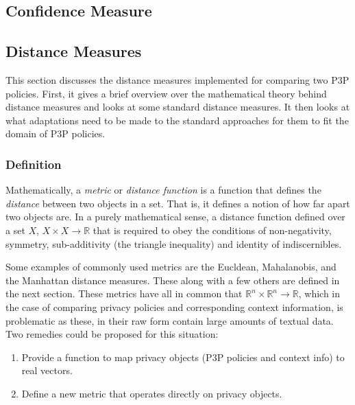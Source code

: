 \subsection{Confidence Measure}\label{confidenceMeasure}%

\subsection{Distance Measures}\label{SimilarityMeasures}%

This section discusses the distance measures implemented for comparing two P3P policies. First, it gives a brief overview over the mathematical theory behind distance measures and looks at some standard distance measures. It then looks at what adaptations need to be made to the standard approaches for them to fit the domain of P3P policies.

\subsubsection{Definition}

Mathematically, a \emph{metric} or \emph{distance function} is a function that defines the \emph{distance} between two objects in a set. That is, it defines a notion of how far apart two objects are. In a purely mathematical sense, a distance function defined over a set $X$, $X\times X\longrightarrow \mathbb{R}$ that is required to obey the conditions of non-negativity, symmetry, sub-additivity (the triangle inequality) and identity of indiscernibles. 

Some examples of commonly used metrics are the Eucldean, Mahalanobis, and the Manhattan distance measures. These along with a few others are defined in the next section. These metrics have all in common that $\mathbb{R}^n\times \mathbb{R}^n\longrightarrow \mathbb{R}$, which in the case of comparing privacy policies and corresponding context information, is problematic as these, in their raw form contain large amounts of textual data. Two remedies could be proposed for this situation:

\begin{enumerate}
\item Provide a function to map privacy objects (P3P policies and context info) to real vectors.
\item Define a new metric that operates directly on privacy objects.
\end{enumerate}

